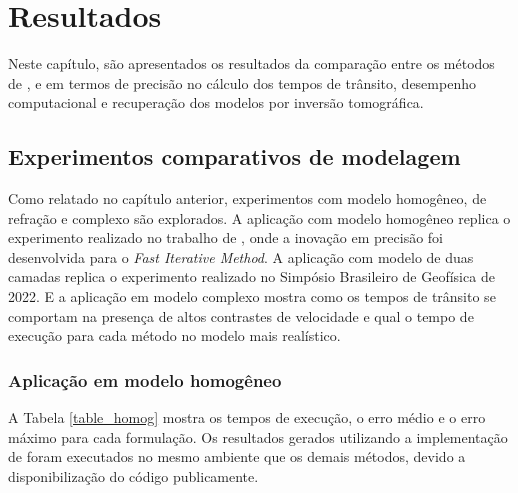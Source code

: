 \chapter{Resultados}
\label{ch:resultados}

Neste capítulo, são apresentados os resultados da comparação entre os métodos de ,  e  em termos de precisão no cálculo dos tempos de trânsito, desempenho computacional e recuperação dos modelos por inversão tomográfica. 

\section{Experimentos comparativos de modelagem}

Como relatado no capítulo anterior, experimentos com modelo homogêneo, de refração e complexo são explorados. A aplicação com modelo homogêneo replica o experimento realizado no trabalho de , onde a inovação em precisão foi desenvolvida para o \textit{Fast Iterative Method}. A aplicação com modelo de duas camadas replica o experimento realizado no Simpósio Brasileiro de Geofísica de 2022. E a aplicação em modelo complexo mostra como os tempos de trânsito se comportam na presença de altos contrastes de velocidade e qual o tempo de execução para cada método no modelo mais realístico.    

\subsection{Aplicação em modelo homogêneo}

A Tabela \ref{table_homog} mostra os tempos de execução, o erro médio e o erro máximo para cada formulação. Os resultados gerados utilizando a implementação de  foram executados no mesmo ambiente que os demais métodos, devido a disponibilização do código publicamente.   

